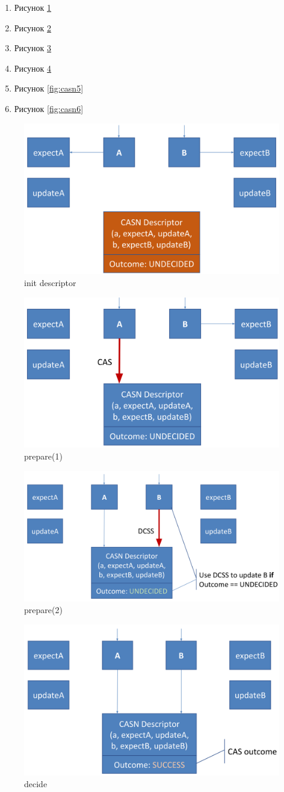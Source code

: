 \documentclass[10pt,a4paper,oneside,titlepage]{article}
\theoremstyle{plain}
\theoremstyle{defenition}
\begin{document}
\begin{enumerate}
	\item Рисунок \ref{fig:casn1}
	\item Рисунок \ref{fig:casn2}
	\item Рисунок \ref{fig:casn3}
	\item Рисунок \ref{fig:casn4}
	\item Рисунок \ref{fig:casn5}
	\item Рисунок \ref{fig:casn6}
\end{enumerate}

\begin{figure}[h!]
	\centering
	\includegraphics[width=0.4\linewidth]{pictures/CASN1}
	\caption{init descriptor}
	\label{fig:casn1}
\end{figure}

\begin{figure}[h!]
	\centering
	\includegraphics[width=0.4\linewidth]{pictures/CASN2}
	\caption{prepare(1)}
	\label{fig:casn2}
\end{figure}

\begin{figure}[h!]
	\centering
	\includegraphics[width=0.4\linewidth]{pictures/CASN3}
	\caption{prepare(2)}
	\label{fig:casn3}
\end{figure}

\begin{figure}[h!]
	\centering
	\includegraphics[width=0.4\linewidth]{pictures/CASN4}
	\caption{decide}
	\label{fig:casn4}
\end{figure}
\end{document}
